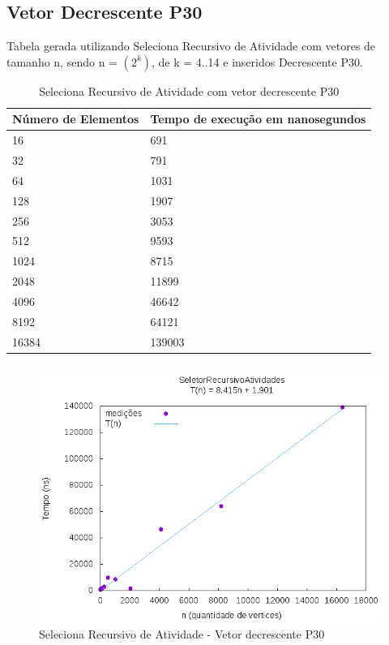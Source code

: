 \documentclass[12pt,a4paper,twoside]{report}
\begin{document}
\subsection{Vetor Decrescente P30}
Tabela gerada utilizando Seleciona Recursivo de Atividade com vetores de tamanho n, sendo n = $(2^k)$, de k = 4..14 e inseridos Decrescente P30.
\begin{table}[H]
\centering
\caption{Seleciona Recursivo de Atividade com vetor decrescente P30}
\label{my-label}
\begin{tabular}{|l|l|}
\hline
\multicolumn{1}{|c|}{\textbf{Número de Elementos}} & \multicolumn{1}{c|}{\textbf{Tempo de execução em nanosegundos}} \\ \hline
16 & 691 \\ \hline
32 & 791 \\ \hline
64 & 1031 \\ \hline
128 & 1907 \\ \hline
256 & 3053 \\ \hline
512 & 9593 \\ \hline
1024 & 8715 \\ \hline
2048 & 11899 \\ \hline
4096 & 46642 \\ \hline
8192 & 64121 \\ \hline
16384 & 139003 \\ \hline

\end{tabular}
\end{table}

\begin{figure}[H]
    \centering
    \includegraphics[width=0.7\linewidth]{graficos/SeletorRecursivoAtividades/Decrescente P30/SelecionaAleatorizado.png}
  \caption{Seleciona Recursivo de Atividade - Vetor decrescente P30}
\end{figure}
\end{document}
